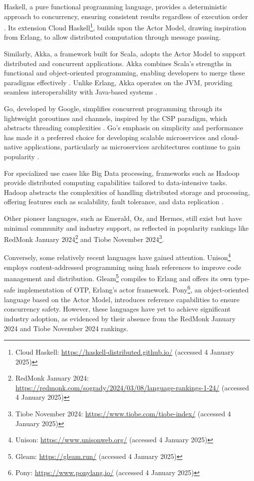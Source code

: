 Haskell, a pure functional programming language, provides a deterministic approach to concurrency, ensuring consistent results regardless of execution order \cite{Valkov2018}. Its extension Cloud Haskell\footnote{Cloud Haskell: \url{https://haskell-distributed.github.io/} (accessed 4 January 2025)}, builds upon the Actor Model, drawing inspiration from Erlang, to allow distributed computation through message passing.

Similarly, Akka, a framework built for Scala, adopts the Actor Model to support distributed and concurrent applications. Akka combines Scala’s strengths in functional and object-oriented programming, enabling developers to merge these paradigms effectively \cite{Valkov2018}. Unlike Erlang, Akka operates on the \gls{JVM}, providing seamless interoperability with Java-based systems \cite{Abraham2023}.

Go, developed by Google, simplifies concurrent programming through its lightweight goroutines and channels, inspired by the \gls{CSP} paradigm, which abstracts threading complexities \cite{Brolos2021}. Go’s emphasis on simplicity and performance has made it a preferred choice for developing scalable microservices and cloud-native applications, particularly as microservices architectures continue to gain popularity \cite{go-docs}.

For specialized use cases like Big Data processing, frameworks such as Hadoop provide distributed computing capabilities tailored to data-intensive tasks. Hadoop abstracts the complexities of handling distributed storage and processing, offering features such as scalability, fault tolerance, and data replication \cite{Polato2014}.

Other pioneer languages, such as Emerald, Oz, and Hermes, still exist but have minimal community and industry support, as reflected in popularity rankings like RedMonk January 2024\footnote{RedMonk January 2024: \url{https://redmonk.com/sogrady/2024/03/08/language-rankings-1-24/} (accessed 4 January 2025)} and Tiobe November 2024\footnote{Tiobe November 2024: \url{https://www.tiobe.com/tiobe-index/} (accessed 4 January 2025)}.

Conversely, some relatively recent languages have gained attention. Unison\footnote{Unison: \url{https://www.unisonweb.org/} (accessed 4 January 2025)} employs content-addressed programming using hash references to improve code management and distribution. Gleam\footnote{Gleam: \url{https://gleam.run/} (accessed 4 January 2025)} compiles to Erlang and offers its own type-safe implementation of \gls{OTP}, Erlang’s actor framework. Pony\footnote{Pony: \url{https://www.ponylang.io/} (accessed 4 January 2025)}, an object-oriented language based on the Actor Model, introduces reference capabilities to ensure concurrency safety. However, these languages have yet to achieve significant industry adoption, as evidenced by their absence from the RedMonk January 2024 and Tiobe November 2024 rankings.


